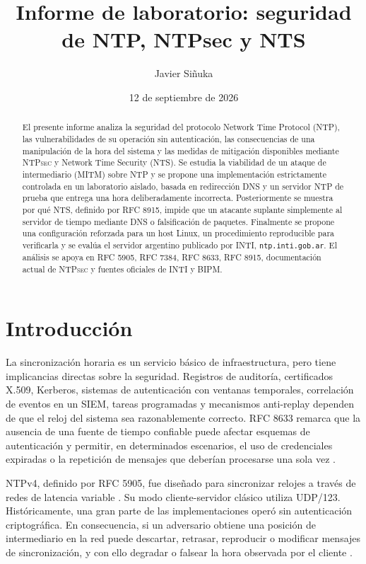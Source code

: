 \documentclass[11pt,a4paper]{article}
\title{Informe de laboratorio: seguridad de NTP, NTPsec y NTS}
\author{Javier Siñuka}
\date{12 de septiembre de 2026}
\newcommand{\ntpsec}{\textsc{NTPsec}}
\newcommand{\nts}{\textsc{NTS}}
\begin{document}
\maketitle
\thispagestyle{plain}

\clearpage
\tableofcontents
\newpage

\begin{abstract}
El presente informe analiza la seguridad del protocolo Network Time Protocol (NTP), las vulnerabilidades de su operación sin autenticación, las consecuencias de una manipulación de la hora del sistema y las medidas de mitigación disponibles mediante \ntpsec{} y Network Time Security (\nts{}). Se estudia la viabilidad de un ataque de intermediario (MITM) sobre NTP y se propone una implementación estrictamente controlada en un laboratorio aislado, basada en redirección DNS y un servidor NTP de prueba que entrega una hora deliberadamente incorrecta. Posteriormente se muestra por qué \nts{}, definido por RFC 8915, impide que un atacante suplante simplemente al servidor de tiempo mediante DNS o falsificación de paquetes. Finalmente se propone una configuración reforzada para un host Linux, un procedimiento reproducible para verificarla y se evalúa el servidor argentino publicado por INTI, \texttt{ntp.inti.gob.ar}. El análisis se apoya en RFC 5905, RFC 7384, RFC 8633, RFC 8915, documentación actual de \ntpsec{} y fuentes oficiales de INTI y BIPM.
\end{abstract}

\section{Introducción}

La sincronización horaria es un servicio básico de infraestructura, pero tiene implicancias directas sobre la seguridad. Registros de auditoría, certificados X.509, Kerberos, sistemas de autenticación con ventanas temporales, correlación de eventos en un SIEM, tareas programadas y mecanismos anti-replay dependen de que el reloj del sistema sea razonablemente correcto. RFC 8633 remarca que la ausencia de una fuente de tiempo confiable puede afectar esquemas de autenticación y permitir, en determinados escenarios, el uso de credenciales expiradas o la repetición de mensajes que deberían procesarse una sola vez \cite{rfc8633}.

NTPv4, definido por RFC 5905, fue diseñado para sincronizar relojes a través de redes de latencia variable \cite{rfc5905}. Su modo cliente-servidor clásico utiliza UDP/123. Históricamente, una gran parte de las implementaciones operó sin autenticación criptográfica. En consecuencia, si un adversario obtiene una posición de intermediario en la red puede descartar, retrasar, reproducir o modificar mensajes de sincronización, y con ello degradar o falsear la hora observada por el cliente \cite{rfc7384,rfc8633}.
\end{document}
